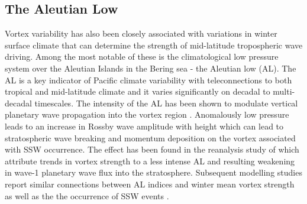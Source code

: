 \subsection{The Aleutian Low}
Vortex variability has also been closely associated with variations in winter surface climate that can determine the strength of mid-latitude tropospheric wave driving. Among the most notable of these is the climatological low pressure system over the Aleutian Islands in the Bering sea - the Aleutian low (AL). The AL is a key indicator of Pacific climate variability with teleconnections to both tropical and mid-latitude climate \citep{Nitta1989, Trenberth1994, Zhang1997} and it varies significantly on decadal to multi-decadal timescales. The intensity of the AL has been shown to modulate vertical planetary wave propagation into the vortex region \citep{Woo2015, Garfinkel2010, Manzini2006}. Anomalously low pressure leads to an increase in Rossby wave amplitude with height \citep{Plumb2003} which can lead to stratospheric wave breaking and momentum deposition on the vortex associated with SSW occurrence. The effect has been found in the reanalysis study of \cite{Hu2018} which attribute trends in vortex strength to a less intense AL and resulting weakening in wave-1 planetary wave flux into the stratosphere. Subsequent modelling studies report similar connections between AL indices and winter mean vortex strength as well as the the occurrence of SSW events \citep{Taguchi2006,kren2016, Kang2017}. 


